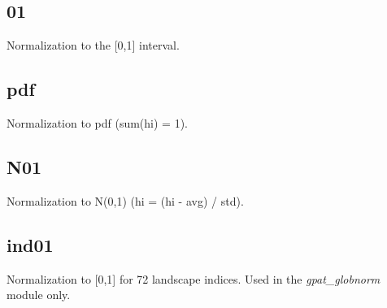 \subsection{01}

Normalization to the [0,1] interval.

\subsection{pdf}

Normalization to pdf (sum(hi) = 1).

\subsection{N01}

Normalization to N(0,1) (hi = (hi - avg) / std).

\subsection{ind01}

Normalization to [0,1] for 72 landscape indices.
Used in the {\it gpat\_globnorm} module only.

